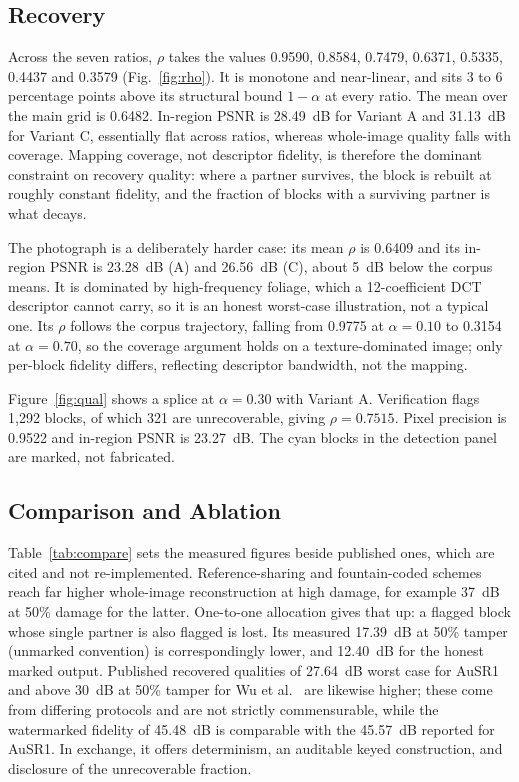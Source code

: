 \subsection{Recovery}
Across the seven ratios, $\rho$ takes the values 0.9590, 0.8584, 0.7479, 0.6371, 0.5335, 0.4437 and 0.3579 (Fig.~\ref{fig:rho}). It is monotone and near-linear, and sits 3 to 6 percentage points above its structural bound $1-\alpha$ at every ratio. The mean over the main grid is 0.6482. In-region PSNR is 28.49~dB for Variant A and 31.13~dB for Variant C, essentially flat across ratios, whereas whole-image quality falls with coverage. Mapping coverage, not descriptor fidelity, is therefore the dominant constraint on recovery quality: where a partner survives, the block is rebuilt at roughly constant fidelity, and the fraction of blocks with a surviving partner is what decays.

The photograph is a deliberately harder case: its mean $\rho$ is 0.6409 and its in-region PSNR is 23.28~dB (A) and 26.56~dB (C), about 5~dB below the corpus means. It is dominated by high-frequency foliage, which a 12-coefficient DCT descriptor cannot carry, so it is an honest worst-case illustration, not a typical one. Its $\rho$ follows the corpus trajectory, falling from 0.9775 at $\alpha=0.10$ to 0.3154 at $\alpha=0.70$, so the coverage argument holds on a texture-dominated image; only per-block fidelity differs, reflecting descriptor bandwidth, not the mapping.

Figure~\ref{fig:qual} shows a splice at $\alpha=0.30$ with Variant A. Verification flags 1,292 blocks, of which 321 are unrecoverable, giving $\rho=0.7515$. Pixel precision is 0.9522 and in-region PSNR is 23.27~dB. The cyan blocks in the detection panel are marked, not fabricated.

\subsection{Comparison and Ablation}
Table~\ref{tab:compare} sets the measured figures beside published ones, which are cited and not re-implemented. Reference-sharing and fountain-coded schemes \cite{zhang2011reference,korus2013efficient} reach far higher whole-image reconstruction at high damage, for example 37~dB at 50\% damage for the latter. One-to-one allocation gives that up: a flagged block whose single partner is also flagged is lost. Its measured 17.39~dB at 50\% tamper (unmarked convention) is correspondingly lower, and 12.40~dB for the honest marked output. Published recovered qualities of 27.64~dB worst case for AuSR1 \cite{ausr1} and above 30~dB at 50\% tamper for Wu et al.\ \cite{wu2026multifeature} are likewise higher; these come from differing protocols and are not strictly commensurable, while the watermarked fidelity of 45.48~dB is comparable with the 45.57~dB reported for AuSR1. In exchange, it offers determinism, an auditable keyed construction, and disclosure of the unrecoverable fraction.

